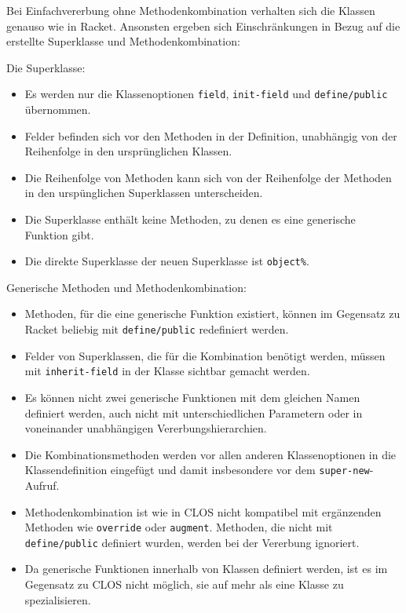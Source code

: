 Bei Einfachvererbung ohne Methodenkombination verhalten sich die Klassen genauso wie in Racket. Ansonsten ergeben sich Einschränkungen in Bezug auf die erstellte Superklasse und Methodenkombination:

Die Superklasse:
\begin{itemize}
 \item Es werden nur die Klassenoptionen \texttt{field}, \texttt{init-field} und \texttt{define/public} übernommen.
 \item Felder befinden sich vor den Methoden in der Definition, unabhängig von der Reihenfolge in den ursprünglichen Klassen.
 \item Die Reihenfolge von Methoden kann sich von der Reihenfolge der Methoden in den urspünglichen Superklassen unterscheiden.  
 \item Die Superklasse enthält keine Methoden, zu denen es eine generische Funktion gibt.
 \item Die direkte Superklasse der neuen Superklasse ist \texttt{object\%}.
\end{itemize}

Generische Methoden und Methodenkombination:
\begin{itemize}
 \item Methoden, für die eine generische Funktion existiert, können im Gegensatz zu Racket beliebig mit \texttt{define/public} redefiniert werden.
 \item Felder von Superklassen, die für die Kombination benötigt werden, müssen mit \texttt{inherit-field} in der Klasse sichtbar gemacht werden.
 \item Es können nicht zwei generische Funktionen mit dem gleichen Namen definiert werden, auch nicht mit unterschiedlichen Parametern oder in voneinander unabhängigen Vererbungshierarchien.
 \item Die Kombinationsmethoden werden vor allen anderen Klassenoptionen in die Klassendefinition eingefügt und damit insbesondere vor dem \texttt{super-new}-Aufruf.
 \item Methodenkombination ist wie in CLOS nicht kompatibel mit ergänzenden Methoden wie \texttt{override} oder \texttt{augment}. Methoden, die nicht mit \texttt{define/public} definiert wurden, werden bei der Vererbung ignoriert.
 \item Da generische Funktionen innerhalb von Klassen definiert werden, ist es im Gegensatz zu CLOS nicht möglich, sie auf mehr als eine Klasse zu spezialisieren.
\end{itemize}

